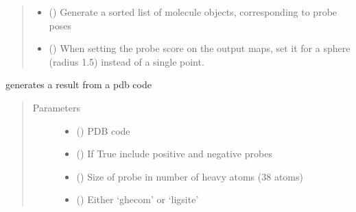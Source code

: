\documentclass[letterpaper,10pt,english]{sphinxmanual}
\begin{document}
\begin{fulllineitems}
\begin{fulllineitems}
\begin{quote}
\begin{description}
\begin{itemize}
\item {} 
 () \textendash{} Generate a sorted list of molecule objects, corresponding to probe poses

\item {} 
 () \textendash{} When setting the probe score on the output maps, set it for a sphere (radius 1.5) instead of a single point.

\end{itemize}

\end{description}\end{quote}

\end{fulllineitems}


\begin{fulllineitems}
\label{\detokenize{calculation_api:hotspots.calculation.Runner.from_pdb}}
generates a result from a pdb code
\begin{quote}\begin{description}
\item[{Parameters}] \leavevmode\begin{itemize}
\item {} 
 () \textendash{} PDB code

\item {} 
 () \textendash{} If True include positive and negative probes

\item {} 
 () \textendash{} Size of probe in number of heavy atoms (3\sphinxhyphen{}8 atoms)

\item {} 
 () \textendash{} Either ‘ghecom’ or ‘ligsite’


\end{itemize}
\end{description}
\end{quote}
\end{fulllineitems}
\end{fulllineitems}
\end{document}
